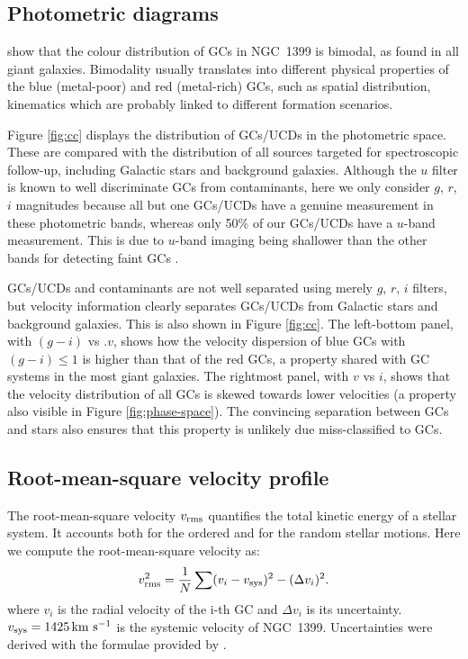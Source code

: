 \documentclass[useAMS,usenatbib]{mn2e}
\newcommand{\kms}{\mbox{\,km~s$^{-1}$}}
\begin{document}
\subsection{Photometric diagrams}

show that the colour distribution of GCs in NGC~1399 is bimodal, as found in 
all giant galaxies. Bimodality usually translates into different physical 
properties of the blue (metal-poor) and red (metal-rich) GCs, such as spatial 
distribution, kinematics which are probably linked to different formation 
scenarios. 

Figure \ref{fig:cc} displays the distribution of GCs/UCDs in the photometric 
space. These are compared with the distribution of all sources targeted for 
spectroscopic follow-up, including Galactic stars and background galaxies. 
Although the $u$ filter is known to well discriminate GCs from contaminants, 
here we only consider $g$, $r$, $i$ magnitudes because all but one GCs/UCDs 
have a genuine measurement in these photometric bands, whereas only 50\% of our 
GCs/UCDs have a $u$-band measurement. This is due to $u$-band imaging being 
shallower than the other bands for detecting faint GCs \citep{DAbrusco16}.

GCs/UCDs and contaminants are not well separated using merely $g$, $r$, $i$ 
filters, but velocity information clearly separates GCs/UCDs from Galactic 
stars and background galaxies. This is also shown in Figure \ref{fig:cc}. The 
left-bottom panel, with $(g-i)$ vs .$v$, shows how the velocity dispersion of 
blue GCs with $(g-i) \le 1$ is higher than that of the red GCs, a property 
shared with GC systems in the most giant galaxies. The rightmost panel, with 
$v$ vs $i$, shows that the velocity distribution of all GCs is skewed towards 
lower velocities (a property also visible in Figure \ref{fig:phase-space}). The 
convincing separation between GCs and stars also ensures that this property is 
unlikely due miss-classified to GCs. 

\subsection{Root-mean-square velocity profile}
The root-mean-square velocity $v_{\rm rms}$ quantifies the total kinetic energy 
of a stellar system. It accounts both for the ordered and for the random 
stellar motions. Here we compute the root-mean-square velocity as:
\begin{equation}
v_{\rm rms}^2 = \frac{1}{N}  \sum (v_i - v_{\rm sys})^2 - (\Delta v_i)^2 .
\label{eq:sigma}
\end{equation}
where $v_i$ is the radial velocity of the i-th GC and $\Delta v_i$ is its 
uncertainty. $v_{\rm sys}=1425 \kms$ is the systemic velocity of NGC~1399. 
Uncertainties were derived with the formulae provided by \citet{Danese}. 
\end{document}
